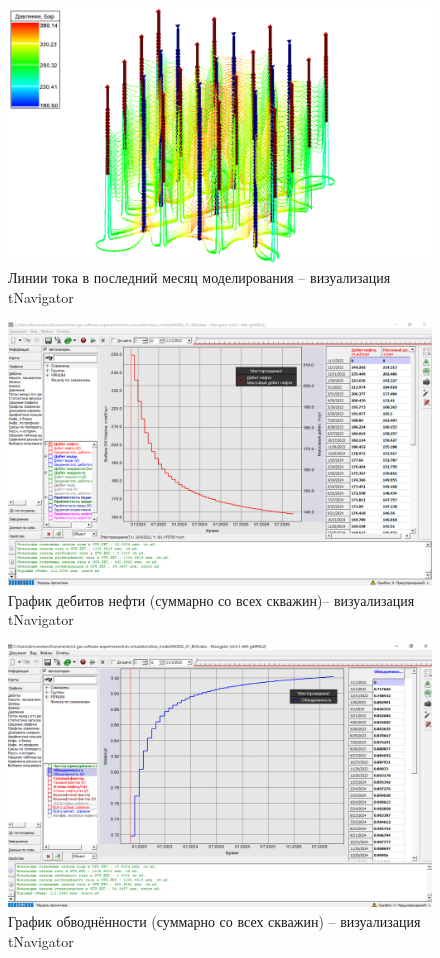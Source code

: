 \documentclass[a4paper,12pt]{article}
\begin{document}
\begin{figure}[H]
\center
\includegraphics[width=\textwidth]{tnav_flow_lines_end_box_model}
\caption{Линии тока в последний месяц моделирования -- визуализация tNavigator}
\label{fig:tnav_flow_lines_end_box_model}
\end{figure}

\begin{figure}[H]
\center
\includegraphics[width=\textwidth]{tnav_fopr_box_model}
\caption{График дебитов нефти (суммарно со всех скважин)-- визуализация tNavigator}
\label{fig:tnav_fopr_box_model}
\end{figure}

\begin{figure}[H]
\center
\includegraphics[width=\textwidth]{tnav_fwct_box_model}
\caption{График обводнённости (суммарно со всех скважин) -- визуализация tNavigator}
\label{fig:tnav_fwct_box_model}
\end{figure}
\end{document}
